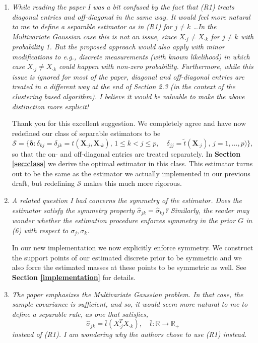 \documentclass[12pt]{article}
\def\bs{\boldsymbol}
\def\bb{\mathbb}
\begin{document}
\begin{enumerate}
\item \emph{While reading the paper I was a bit confused by the fact that (R1) treats diagonal entries and off-diagonal in the same way. It would feel more natural to me to define a separable estimator as in (R1) for $j\neq k$ \ldots In the Multivariate Gaussian case this is not an issue, since $X_{\cdot j}\neq X_{\cdot k}$ for $j\neq k$ with probability 1. But the proposed approach would also apply with minor modifications to e.g., discrete measurements (with known likelihood) in which case $X_{\cdot j}\neq X_{\cdot k}$ could happen with non-zero probability. Furthermore, while this issue is ignored for most of the paper, diagonal and off-diagonal entries are treated in a different way at the end of Section 2.3 (in the context of the clustering based algorithm). I believe it would be valuable to make the above distinction more explicit!}

  Thank you for this excellent suggestion. We completely agree and have now redefined our class of separable estimators to be
  \[
  \mathcal{S} = \{\bs{\delta} : \delta_{kj} = \delta_{jk} = t(\bs{X}_{\cdot j}, \bs{X}_{\cdot k}),\, 1\leq k<j\leq p,\quad 
   \delta_{jj} = \widetilde{t}(\bs{X}_{\cdot j}),\,j=1,\ldots,p)\},
 \]
 so that the on- and off-diagonal entries are treated separately. In \textbf{Section \ref{sec:class}} we derive the optimal estimator in this class. This estimator turns out to be the same as the estimator we actually implemented in our previous draft, but redefining $\mathcal{S}$ makes this much more rigorous.

\item \emph{A related question I had concerns the symmetry of the estimator. Does the estimator satisfy the symmetry property $\hat{\sigma}_{jk} =\hat{\sigma}_{kj}$? Similarly, the reader may wonder whether the estimation procedure enforces symmetry in the prior $G$ in (6) with respect to $\sigma_j,\sigma_k$.}

  In our new implementation we now explicitly enforce symmetry. We construct the support points of our estimated discrete prior to be symmetric and we also force the estimated masses at these points to be symmetric as well. See \textbf{Section \ref{implementation}} for details.
  
\item \emph{The paper emphasizes the Multivariate Gaussian problem. In that case, the sample covariance is sufficient, and so, it would seem more natural to me to define a separable rule, as one that satisfies,
$$\hat{\sigma}_{jk} = \bar{t}(X_{\cdot j}^TX_{\cdot k}),\quad \bar{t}: \bb{R}\to \bb{R}_{+}$$
instead of (R1). I am wondering why the authors chose to use (R1) instead.}


\end{enumerate}
\end{document}
